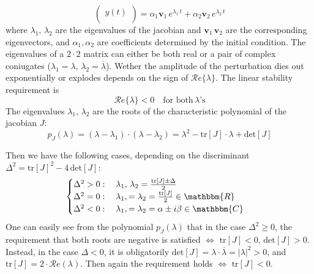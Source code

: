 {\begin{equation*}
\begin{pmatrix}
        y(t) \\
    \end{pmatrix}
     = 
     \alpha_1 \mathbf{v}_1\, e^{\lambda_1\, t} + \alpha_2 \mathbf{v}_2\, e^{\lambda_2\, t} 
\end{equation*}
where $\lambda_1,\, \lambda_2$ are the eigenvalues of the jacobian and $\mathbf{v}_1\, \mathbf{v}_2$ are the corresponding eigenvectors, and $\alpha_1, \alpha_2$ are coefficients determined by the initial condition. The eigenvalues of a $2\cdot 2$ matrix can either be both real or a pair of complex coniugates ($\lambda_1 = \lambda, \, \lambda_2 = \overline{\lambda}$). Wether the amplitude of the perturbation dies out exponentially or explodes depends on the sign of $\mathcal{R}e\{\lambda\}$. The linear stability requirement is
$$
\mathcal{R}e\{\lambda\} <0 \quad \text{for both} \, \lambda\text{'s}
$$
The eigenvalues $\lambda_1,\, \lambda_2$ are the roots of the characteristic polynomial of the jacobian $J$:
\begin{equation*}
    p_J(\lambda) = (\lambda - \lambda_1)\cdot (\lambda - \lambda_2) = \lambda^2 - \text{tr}[J]\cdot\lambda + \text{det}[J]
\end{equation*}
\begin{minipage}{0.4\textwidth}
Then we have the following cases, depending on the discriminant $\Delta^2 = \text{tr}[J]^2 - 4\,\text{det}[J]$:
\begin{equation*}
    \begin{cases}
        \Delta^2 > 0: \quad \lambda_1,\, \lambda_2  =  \frac{\text{tr}[J] \pm \Delta }{2} \\
        \Delta^2 = 0: \quad \lambda_1,= \lambda_2 = \frac{\text{tr}[J]}{2} \in \mathbbm{R} \\
        \Delta^2 <0: \quad \lambda_1,= \lambda_2  = \alpha \pm i \beta \in \mathbbm{C}
    \end{cases}
\end{equation*}
One can easily see from the polynomial $p_J(\lambda)$ that in the case $\Delta^2 \geq 0$, the requirement that both roots are negative is satisfied $\iff$ $\text{tr}[J]<0,\, \text{det}[J] >0$. Instead, in the case $\Delta <0$, it is obligatorily $\text{det}[J] = \lambda \cdot \overline{\lambda} = |\lambda|^2 >0$, and $\text{tr}[J]= 2\cdot \mathcal{R}e(\lambda)$. Then again the requirement holds $\iff$ $\text{tr}[J]< 0$.
\end{minipage}
\hfill
\begin{minipage}{0.5\textwidth}
\centering

\end{minipage}}
